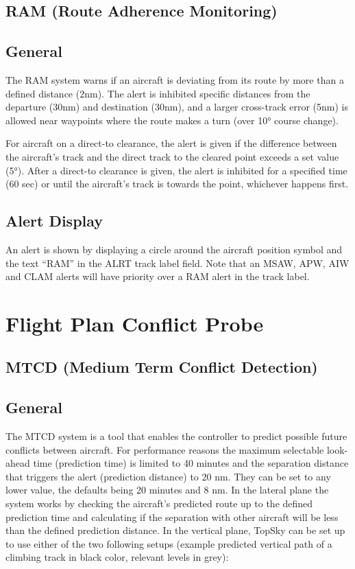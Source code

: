 \documentclass[11pt,a4paper,oldfontcommands]{memoir}
\begin{document}
\subsection{RAM (Route Adherence Monitoring)}

\subsection*{General}

The RAM system warns if an aircraft is deviating from its route by more than a defined distance (2nm). The alert is inhibited specific distances from the departure (30nm) and destination (30nm), and a larger cross-track error (5nm) is allowed near waypoints where the route makes a turn (over 10° course change).

For aircraft on a direct-to clearance, the alert is given if the difference between the aircraft’s track and the direct track to the cleared point exceeds a set value (5°). After a direct-to clearance is given, the alert is inhibited for a specified time (60 sec) or until the aircraft’s track is towards the point, whichever happens first.

\subsection*{Alert Display}

An alert is shown by displaying a circle around the aircraft position symbol and the text “RAM” in the ALRT track label field. Note that an MSAW, APW, AIW and CLAM alerts will have priority over a RAM alert in the track label.

\section{Flight Plan Conflict Probe}

\subsection{MTCD (Medium Term Conflict Detection)}

\subsection*{General}

The MTCD system is a tool that enables the controller to predict possible future conflicts between aircraft. For performance reasons the maximum selectable look-ahead time (prediction time) is limited to 40 minutes and the separation distance that triggers the alert (prediction distance) to 20 nm. They can be set to any lower value, the defaults being 20 minutes and 8 nm.
In the lateral plane the system works by checking the aircraft’s predicted route up to the defined prediction time and calculating if the separation with other aircraft will be less than the defined prediction distance.
In the vertical plane, TopSky can be set up to use either of the two following setups (example predicted vertical path of a climbing track in black color, relevant levels in grey):
\end{document}
